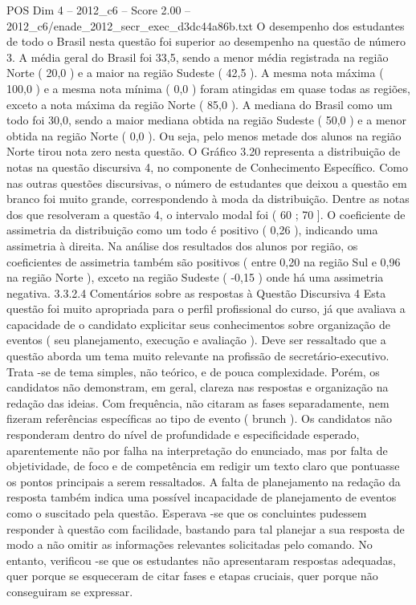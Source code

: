 \begin{textsample}{POS Dim 4 – 2012\_c6 – Score 2.00 – 2012\_c6/enade\_2012\_secr\_exec\_d3dc44a86b.txt}
O desempenho dos estudantes de todo o Brasil nesta questão foi superior ao desempenho na questão de número 3.
A média geral do Brasil foi 33,5, sendo a menor média registrada na região Norte ( 20,0 ) e a maior na região Sudeste ( 42,5 ).
A mesma nota máxima ( 100,0 ) e a mesma nota mínima ( 0,0 ) foram atingidas em quase todas as regiões, exceto a nota máxima da região Norte ( 85,0 ).
A mediana do Brasil como um todo foi 30,0, sendo a maior mediana obtida na região Sudeste ( 50,0 ) e a menor obtida na região Norte ( 0,0 ).
Ou seja, pelo menos metade dos alunos na região Norte tirou nota zero nesta questão.
O Gráfico 3.20 representa a distribuição de notas na questão discursiva 4, no componente de Conhecimento Específico.
Como nas outras questões discursivas, o número de estudantes que deixou a questão em branco foi muito grande, correspondendo à moda da distribuição.
Dentre as notas dos que resolveram a questão 4, o intervalo modal foi ( 60 ; 70 ].
O coeficiente de assimetria da distribuição como um todo é positivo ( 0,26 ), indicando uma assimetria à direita.
Na análise dos resultados dos alunos por região, os coeficientes de assimetria também são positivos ( entre 0,20 na região Sul e 0,96 na região Norte ), exceto na região Sudeste ( -0,15 ) onde há uma assimetria negativa. 3.3.2.4 Comentários sobre as respostas à Questão Discursiva 4 Esta questão foi muito apropriada para o perfil profissional do curso, já que avaliava a capacidade de o candidato explicitar seus conhecimentos sobre organização de eventos ( seu planejamento, execução e avaliação ).
Deve ser ressaltado que a questão aborda um tema muito relevante na profissão de secretário-executivo.
Trata -se de tema simples, não teórico, e de pouca complexidade.
Porém, os candidatos não demonstram, em geral, clareza nas respostas e organização na redação das ideias.
Com frequência, não citaram as fases separadamente, nem fizeram referências específicas ao tipo de evento ( brunch ).
Os candidatos não responderam dentro do nível de profundidade e especificidade esperado, aparentemente não por falha na interpretação do enunciado, mas por falta de objetividade, de foco e de competência em redigir um texto claro que pontuasse os pontos principais a serem ressaltados.
A falta de planejamento na redação da resposta também indica uma possível incapacidade de planejamento de eventos como o suscitado pela questão.
Esperava -se que os concluintes pudessem responder à questão com facilidade, bastando para tal planejar a sua resposta de modo a não omitir as informações relevantes solicitadas pelo comando.
No entanto, verificou -se que os estudantes não apresentaram respostas adequadas, quer porque se esqueceram de citar fases e etapas cruciais, quer porque não conseguiram se expressar.

\end{textsample}
